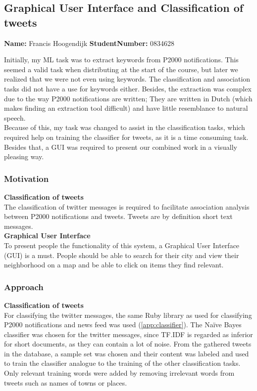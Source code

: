 \subsection{Graphical User Interface and Classification of tweets}
\textbf{Name:} Francis Hoogendijk \indent \textbf{StudentNumber:} 0834628

Initially, my ML task was to extract keywords from P2000 notifications. This seemed a valid task when distributing at the start of the course, but later we realized that we were not even using keywords. The classification and association tasks did not have a use for keywords either. Besides, the extraction was complex due to the way P2000 notifications are written; They are written in Dutch (which makes finding an extraction tool difficult) and have little resemblance to natural speech. \\

Because of this, my task was changed to assist in the classification tasks, which required help on training the classifier for tweets, as it is a time consuming task. Besides that, a GUI was required to present our combined work in a visually pleasing way.

\subsubsection*{Motivation}
\textbf{Classification of tweets}\\
The classification of twitter messages is required to facilitate association analysis between P2000 notifications and tweets. Tweets are by definition short text messages.\\

\textbf{Graphical User Interface}\\
To present people the functionality of this system, a Graphical User Interface (GUI) is a must. People should be able to search for their city and view their neighborhood on a map and be able to click on items they find relevant. 
\subsubsection*{Approach}
\textbf{Classification of tweets}\\
For classifying the twitter messages, the same Ruby library as used for classifying P2000 notifications and news feed was used (\autoref{app:classifier}). The Na\"{i}ve Bayes classifier was chosen for the twitter messages, since TF.IDF is regarded as inferior for short documents, as they can contain a lot of noise. From the gathered tweets in the database, a sample set was chosen and their content was labeled and used to train the classifier analogue to the training of the other classification tasks. Only relevant training words were added by removing irrelevant words from tweets such as names of towns or places.\\

